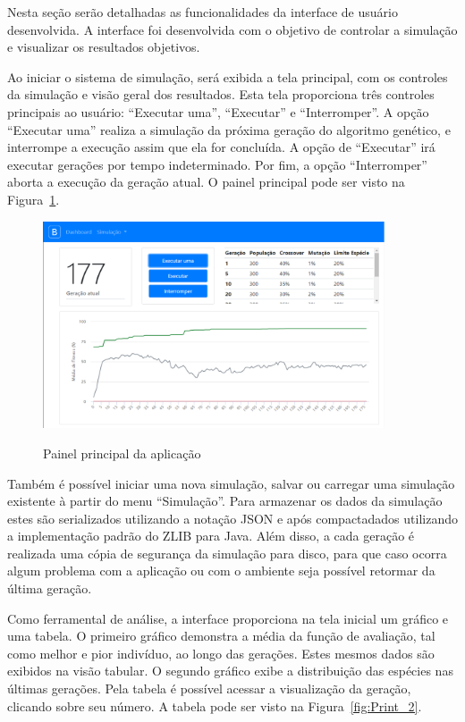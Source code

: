 \documentclass[12pt,oneside,a4paper,english,french,spanish,brazil,]{abntex2}
\begin{document}
Nesta seção serão detalhadas as funcionalidades da interface de usuário desenvolvida. A interface foi desenvolvida com o objetivo de controlar a simulação e visualizar os resultados objetivos. 

Ao iniciar o sistema de simulação, será exibida a tela principal, com os controles da simulação e visão geral dos resultados. Esta tela proporciona três controles principais ao usuário: ``Executar uma'', ``Executar'' e ``Interromper''. A opção ``Executar uma'' realiza a simulação da próxima geração do algoritmo genético, e interrompe a execução assim que ela for concluída. A opção de ``Executar'' irá executar gerações por tempo indeterminado. Por fim, a opção ``Interromper'' aborta a execução da geração atual. O painel principal pode ser visto na Figura~\ref{fig:Print_1}.

\begin{figure}[ht]
\centering
\caption{Painel principal da aplicação}
\includegraphics[width=0.9\textwidth]{imagens/Print_1.png}
\sourceAuthor{}
\label{fig:Print_1}
\end{figure}

Também é possível iniciar uma nova simulação, salvar ou carregar uma simulação existente à partir do menu ``Simulação''. Para armazenar os dados da simulação estes são serializados utilizando a notação JSON \cite{bray:2017} e após compactadados utilizando a implementação padrão do ZLIB \cite{deutsch:1996} para Java. Além disso, a cada geração é realizada uma cópia de segurança da simulação para disco, para que caso ocorra algum problema com a aplicação ou com o ambiente seja possível retormar da última geração.

Como ferramental de análise, a interface proporciona na tela inicial um gráfico e uma tabela. O primeiro gráfico demonstra a média da função de avaliação, tal como melhor e pior indivíduo, ao longo das gerações. Estes mesmos dados são exibidos na visão tabular. O segundo gráfico exibe a distribuição das espécies nas últimas gerações. Pela tabela é possível acessar a visualização da geração, clicando sobre seu número. A tabela pode ser visto na Figura~\ref{fig:Print_2}.
\end{document}
